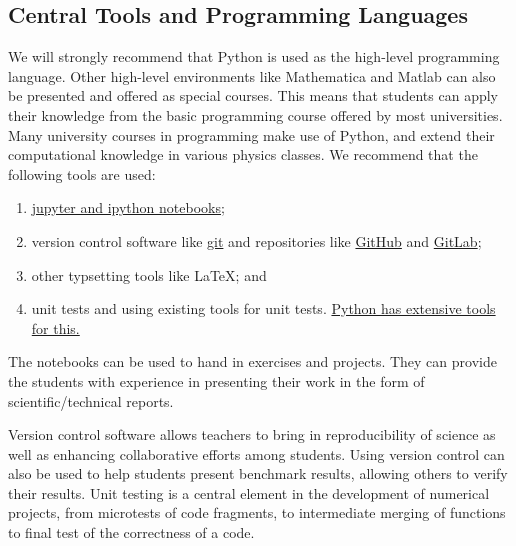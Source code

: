\documentclass[graybox,envcountchap,sectrefs]{svmult}
\begin{document}
\subsection{Central Tools and Programming Languages}
We will strongly recommend that Python is used as the high-level
 programming language. Other high-level environments like Mathematica
 and Matlab can also be presented and offered as special courses. This
 means that students can apply their knowledge from the basic programming course offered by most universities.
Many university courses in programming  make use of Python, and extend their computational knowledge in
 various physics classes. We recommend  that the following
 tools are used:
\begin{enumerate}
\item \href{{http://jupyter.org/}}{jupyter and ipython notebooks};

\item version control software like \href{{https://git-scm.com/}}{git} and repositories like \href{{https://github.com/}}{GitHub} and \href{{https://gitlab.com/}}{GitLab};

\item other typsetting tools like {\LaTeX}; and

\item unit tests and using existing tools for unit tests. \href{{https://docs.python.org/2/library/unittest.html}}{Python has extensive tools for this.}
\end{enumerate}


The notebooks can be used to hand in exercises and projects. They can
provide the students with experience in presenting their work in the
form of scientific/technical reports.

Version control software allows teachers to bring in reproducibility
of science as well as enhancing collaborative efforts among
students. Using version control can also be used to help students
present benchmark results, allowing others to verify their
results. Unit testing is a central element in the development of
numerical projects, from microtests of code fragments, to intermediate
merging of functions to final test of the correctness of a code.
\end{document}

